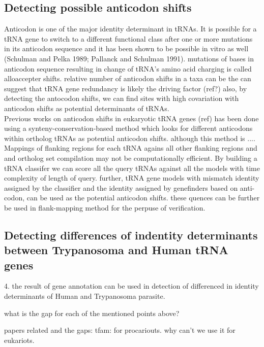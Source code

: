 \documentclass[
10pt, %
a4paper, %
oneside, %
headinclude,footinclude, %
BCOR5mm, %
]{scrartcl}
\begin{document}
\subsection{Detecting possible anticodon shifts}
Anticodon is one of the major identity determinant in tRNAs. It is possible for a tRNA gene to switch to a different functional class after one or more mutations in its anticodon sequence and it has been shown to be possible in vitro as well (Schulman and Pelka 1989; Pallanck and Schulman 1991). mutations of bases in anticodon sequence resulting in change of tRNA’s amino acid charging is called alloaccepter shifts. relative number of anticodon shifts in a taxa can be the can suggest that tRNA gene redundancy is likely the driving factor (ref?)
also, by detecting the antocodon shifts, we can find sites with high covariation with anticodon shifts as potential determinants of tRNAs.\\ 
Previous works on anticodon shifts in eukaryotic tRNA genes (ref) has been done using a synteny-conservation-based method which looks for different anticodons within ortholog tRNAs as potential anticodon shifts. although this method is .... Mappings of flanking regions for each tRNA agains all other flanking regions and and ortholog set compilation may not be computationally efficient. By building a tRNA classifer we can score all the query tRNAs against all the models with time complexity of length of query. further, tRNA gene models with mismatch identity assigned by the classifier and the identity assigned by genefinders based on anti-codon, can be used as the potential anticodon shifts. these quences can be further be used in flank-mapping method for the perpuse of verification. 


\subsection{Detecting differences of indentity determinants between Trypanosoma and Human tRNA genes}

   4. the result of gene annotation can be used in detection of differenced in identity determinants of Human and Trypanosoma parasite. 

what is the gap for each of the mentioned points above?

papers related and the gaps: 
tfam: for procariouts. why can't we use it for eukariots. 


\newpage
\renewcommand{\refname}{\spacedlowsmallcaps{References}} %




\end{document}
